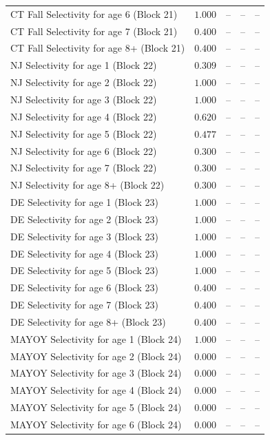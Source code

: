 \documentclass[
]{article}
\begin{document}
\begin{landscape}
\begin{longtable}[t]{lrrrr}
CT Fall Selectivity for age 6 (Block 21) & $1.000$ & -- & -- & --\\
CT Fall Selectivity for age 7 (Block 21) & $0.400$ & -- & -- & --\\
CT Fall Selectivity for age 8+ (Block 21) & $0.400$ & -- & -- & --\\
NJ Selectivity for age 1 (Block 22) & $0.309$ & -- & -- & --\\
\addlinespace
NJ Selectivity for age 2 (Block 22) & $1.000$ & -- & -- & --\\
NJ Selectivity for age 3 (Block 22) & $1.000$ & -- & -- & --\\
NJ Selectivity for age 4 (Block 22) & $0.620$ & -- & -- & --\\
NJ Selectivity for age 5 (Block 22) & $0.477$ & -- & -- & --\\
NJ Selectivity for age 6 (Block 22) & $0.300$ & -- & -- & --\\
\addlinespace
NJ Selectivity for age 7 (Block 22) & $0.300$ & -- & -- & --\\
NJ Selectivity for age 8+ (Block 22) & $0.300$ & -- & -- & --\\
DE Selectivity for age 1 (Block 23) & $1.000$ & -- & -- & --\\
DE Selectivity for age 2 (Block 23) & $1.000$ & -- & -- & --\\
DE Selectivity for age 3 (Block 23) & $1.000$ & -- & -- & --\\
\addlinespace
DE Selectivity for age 4 (Block 23) & $1.000$ & -- & -- & --\\
DE Selectivity for age 5 (Block 23) & $1.000$ & -- & -- & --\\
DE Selectivity for age 6 (Block 23) & $0.400$ & -- & -- & --\\
DE Selectivity for age 7 (Block 23) & $0.400$ & -- & -- & --\\
DE Selectivity for age 8+ (Block 23) & $0.400$ & -- & -- & --\\
\addlinespace
MAYOY Selectivity for age 1 (Block 24) & $1.000$ & -- & -- & --\\
MAYOY Selectivity for age 2 (Block 24) & $0.000$ & -- & -- & --\\
MAYOY Selectivity for age 3 (Block 24) & $0.000$ & -- & -- & --\\
MAYOY Selectivity for age 4 (Block 24) & $0.000$ & -- & -- & --\\
MAYOY Selectivity for age 5 (Block 24) & $0.000$ & -- & -- & --\\
\addlinespace
MAYOY Selectivity for age 6 (Block 24) & $0.000$ & -- & -- & --\\

\end{longtable}
\end{landscape}
\end{document}
